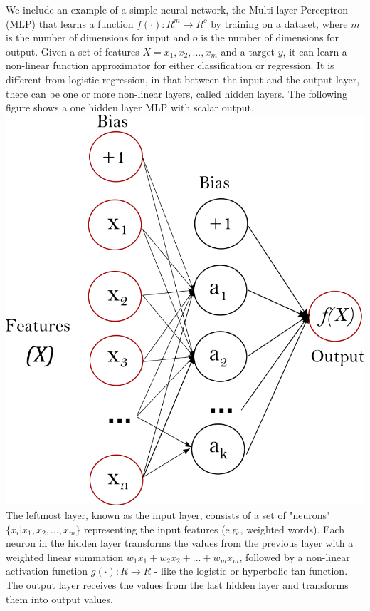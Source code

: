 \documentclass[11pt]{article}
\makeatletter
\def\maxwidth{\ifdim\Gin@nat@width>\linewidth\linewidth
    \else\Gin@nat@width\fi}
\let\Oldincludegraphics\includegraphics
\renewcommand{\includegraphics}[1]{\Oldincludegraphics[width=.8\maxwidth]{#1}}
\makeatother
\begin{document}
We include an example of a simple neural network, the Multi-layer
Perceptron (MLP) that learns a function
\(f(\cdot): R^m \rightarrow R^o\) by training on a dataset, where \(m\)
is the number of dimensions for input and \(o\) is the number of
dimensions for output. Given a set of features
\(X = {x_1, x_2, ..., x_m}\) and a target \(y\), it can learn a
non-linear function approximator for either classification or
regression. It is different from logistic regression, in that between
the input and the output layer, there can be one or more non-linear
layers, called hidden layers. The following figure shows a one hidden
layer MLP with scalar output.
\includegraphics{../data/multilayerperceptron_network.png} The leftmost
layer, known as the input layer, consists of a set of "neurons"
\(\{x_i | x_1, x_2, ..., x_m\}\) representing the input features (e.g.,
weighted words). Each neuron in the hidden layer transforms the values
from the previous layer with a weighted linear summation
\(w_1x_1 + w_2x_2 + ... + w_mx_m\), followed by a non-linear activation
function \(g(\cdot):R \rightarrow R\) - like the logistic or hyperbolic
tan function. The output layer receives the values from the last hidden
layer and transforms them into output values.
\end{document}
